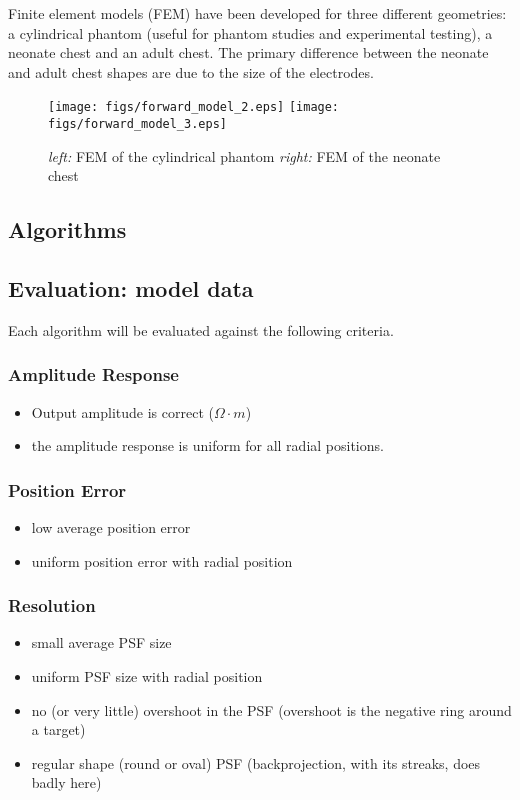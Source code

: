 \documentclass[12pt]{iopart}
\begin{document}
Finite element models (FEM) have been developed for three
different geometries: a cylindrical phantom (useful for 
phantom studies and experimental testing), a
neonate chest and an adult chest. The primary difference
between the neonate and adult chest shapes are due to
the size of the electrodes.

\begin{figure}[bhtp]
\begin{center}
  \texttt{[image: figs/forward\_model\_2.eps]}
  \texttt{[image: figs/forward\_model\_3.eps]}

\caption{ \label{fig:fm2}
{\em left:} FEM of the cylindrical phantom
{\em right:} FEM of the neonate chest 
}
\end{center}
\end{figure}
\subsection{Algorithms}
\subsection{Evaluation: model data}

Each algorithm will be evaluated against the
following criteria.

\subsubsection{Amplitude Response}
   \begin{itemize}
   \item Output amplitude is correct ($\Omega \cdot m$)
   \item the amplitude response is uniform for all radial positions.
   \end{itemize}

\subsubsection{Position Error}
   \begin{itemize}
   \item low average position error
   \item uniform position error with radial position
   \end{itemize}

\subsubsection{ Resolution}
   \begin{itemize}
   \item small average PSF size
   \item uniform PSF size with radial position
   \item no (or very little) overshoot in the PSF
  (overshoot is the negative ring around a target)
   \item regular shape (round or oval) PSF
  (backprojection, with its streaks, does badly here)
   \end{itemize}
\end{document}
